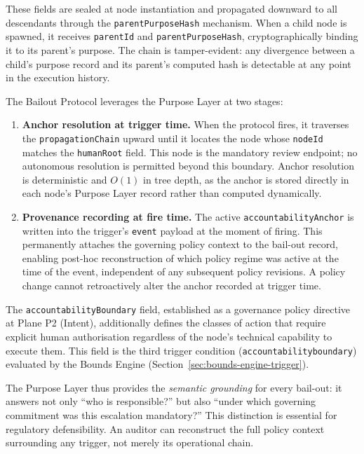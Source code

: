 These fields are sealed at node instantiation and propagated downward to all descendants through the \texttt{parentPurposeHash} mechanism. When a child node is spawned, it receives \texttt{parentId} and \texttt{parentPurposeHash}, cryptographically binding it to its parent's purpose. The chain is tamper-evident: any divergence between a child's purpose record and its parent's computed hash is detectable at any point in the execution history.

The Bailout Protocol leverages the Purpose Layer at two stages:

\begin{enumerate}
  \item \textbf{Anchor resolution at trigger time.} When the protocol fires, it traverses the \texttt{propagationChain} upward until it locates the node whose \texttt{nodeId} matches the \texttt{humanRoot} field. This node is the mandatory review endpoint; no autonomous resolution is permitted beyond this boundary. Anchor resolution is deterministic and $O(1)$ in tree depth, as the anchor is stored directly in each node's Purpose Layer record rather than computed dynamically.
  \item \textbf{Provenance recording at fire time.} The active \texttt{accountabilityAnchor} is written into the trigger's \texttt{event} payload at the moment of firing. This permanently attaches the governing policy context to the bail-out record, enabling post-hoc reconstruction of which policy regime was active at the time of the event, independent of any subsequent policy revisions. A policy change cannot retroactively alter the anchor recorded at trigger time.
\end{enumerate}

The \texttt{accountabilityBoundary} field, established as a governance policy directive at Plane P2 (Intent), additionally defines the classes of action that require explicit human authorisation regardless of the node's technical capability to execute them. This field is the third trigger condition (\texttt{accountability\textunderscore boundary}) evaluated by the Bounds Engine (Section~\ref{sec:bounds-engine-trigger}).

The Purpose Layer thus provides the \emph{semantic grounding} for every bail-out: it answers not only ``who is responsible?'' but also ``under which governing commitment was this escalation mandatory?'' This distinction is essential for regulatory defensibility. An auditor can reconstruct the full policy context surrounding any trigger, not merely its operational chain.

